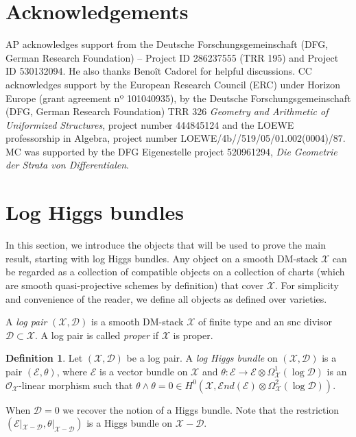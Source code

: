 \documentclass[a4paper]{amsart}
\theoremstyle{definition}
\newtheorem{definition}[theorem]{Definition}
\begin{document}
\section*{Acknowledgements}
AP acknowledges support from the Deutsche Forschungsgemeinschaft (DFG, German Research Foundation) -- Project ID 286237555 (TRR 195) and Project ID 530132094. He also thanks Beno\^it Cadorel for helpful discussions. CC acknowledges support by the European Research Council (ERC) under Horizon Europe (grant agreement nº 101040935), by the Deutsche Forschungsgemeinschaft (DFG, German Research Foundation) TRR 326 \textit{Geometry and Arithmetic of Uniformized Structures}, project number 444845124 and the LOEWE professorship in Algebra, project number LOEWE/4b//519/05/01.002(0004)/87. MC was supported by the DFG Eigenestelle project  520961294, \emph{Die Geometrie der Strata von Differentialen}.

\section{Log Higgs bundles}

In this section, we introduce the objects that will be used to prove the main result, starting with log Higgs bundles. Any object on a smooth DM-stack $\mathscr{X}$ can be regarded as a collection of compatible objects on a collection of charts (which are smooth quasi-projective schemes by definition) that cover $\mathscr{X}$. For simplicity and convenience of the reader, we define all objects as defined over varieties.

A \emph{log pair} $(\mathscr{X},\mathscr{D})$ is a smooth DM-stack $\mathscr{X}$ of finite type and an snc divisor $\mathscr{D}\subset\mathscr{X}$. A log pair is called \emph{proper} if $\mathscr{X}$ is proper.

\begin{definition}
Let $(\mathscr{X},\mathscr{D})$ be a log pair. A \emph{log Higgs bundle} on $(\mathscr{X},\mathscr{D})$ is a pair $(\mathcal{E},\theta)$, where $\mathcal{E}$ is a vector bundle on $\mathscr{X}$ and $\theta:\mathcal{E}\to\mathcal{E}\otimes\Omega^1_{\mathscr{X}}(\log \mathscr{D})$ is an $\mathcal{O}_\mathscr{X}$-linear morphism such that $\theta\wedge\theta=0\in H^0(\mathscr{X},\mathcal{E}nd(\mathcal{E})\otimes\Omega^2_{\mathscr{X}}(\log \mathscr{D}))$. 
\end{definition}

When $\mathscr{D}=0$ we recover the notion of a Higgs bundle. Note that the restriction $(\mathcal{E}|_{\mathscr{X}-\mathscr{D}},\theta|_{\mathscr{X}-\mathscr{D}})$ is a Higgs bundle on $\mathscr{X}-\mathscr{D}$. 
\end{document}
